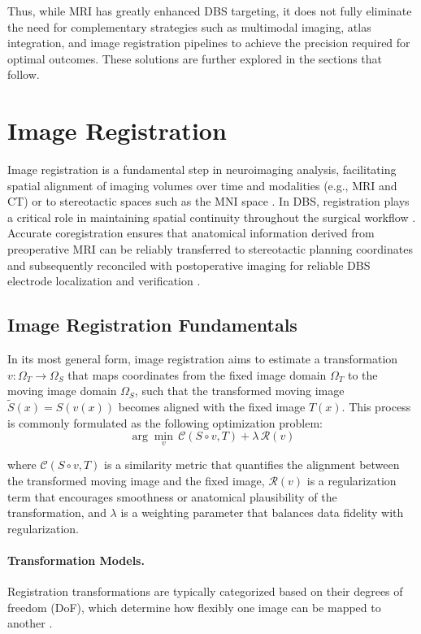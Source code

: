 Thus, while MRI has greatly enhanced DBS targeting, it does not fully eliminate the need for complementary strategies such as multimodal imaging, atlas integration, and image registration pipelines to achieve the precision required for optimal outcomes. These solutions are further explored in the sections that follow.

\section{Image Registration}
\label{sec:registration}
Image registration is a fundamental step in neuroimaging analysis, facilitating spatial alignment of imaging volumes over time and modalities (e.g., MRI and CT) or to stereotactic spaces such as the MNI space \cite{Risholm2011-rm}. In DBS, registration plays a critical role in maintaining spatial continuity throughout the surgical workflow \cite{Geevarghese2016-qo}. Accurate coregistration ensures that anatomical information derived from preoperative MRI can be reliably transferred to stereotactic planning coordinates and subsequently reconciled with postoperative imaging for reliable DBS electrode localization and verification \cite{Lofredi2022-wi,Abbass2025-el}.

\subsection{Image Registration Fundamentals}
In its most general form, image registration aims to estimate a transformation \( v: \Omega_T \rightarrow \Omega_S \) that maps coordinates from the fixed image domain \( \Omega_T \) to the moving image domain \( \Omega_S \), such that the transformed moving image \( \tilde{S}(x) = S(v(x)) \) becomes aligned with the fixed image \( T(x) \). This process is commonly formulated as the following optimization problem:
\begin{equation}
    \arg\min_{v} \, \mathcal{C}(S \circ v, T) + \lambda \, \mathcal{R}(v)
    \label{eq:registration_loss}
\end{equation}

where \( \mathcal{C}(S \circ v, T) \) is a similarity metric that quantifies the alignment between the transformed moving image and the fixed image, \( \mathcal{R}(v) \) is a regularization term that encourages smoothness or anatomical plausibility of the transformation, and \( \lambda \) is a weighting parameter that balances data fidelity with regularization.

\paragraph{Transformation Models.}
Registration transformations are typically categorized based on their degrees of freedom (DoF), which determine how flexibly one image can be mapped to another \cite{Chen2023-wx, Zitova2003-ds, Maintz1998-gs}.

